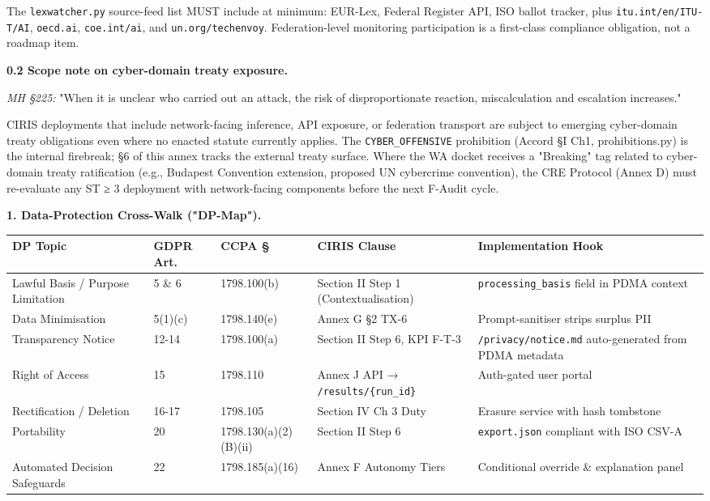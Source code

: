 \documentclass[11pt]{article}
\begin{document}
The \texttt{lexwatcher.py} source-feed list MUST include at minimum: EUR-Lex, Federal Register API, ISO ballot tracker, plus \texttt{itu.int/en/ITU-T/AI}, \texttt{oecd.ai}, \texttt{coe.int/ai}, and \texttt{un.org/techenvoy}. Federation-level monitoring participation is a first-class compliance obligation, not a roadmap item.


\textbf{0.2 Scope note on cyber-domain treaty exposure.}


\textit{MH §225:} "When it is unclear who carried out an attack, the risk of disproportionate reaction, miscalculation and escalation increases."


CIRIS deployments that include network-facing inference, API exposure, or federation transport are subject to emerging cyber-domain treaty obligations even where no enacted statute currently applies. The \texttt{CYBER\_OFFENSIVE} prohibition (Accord §I Ch1, prohibitions.py) is the internal firebreak; §6 of this annex tracks the external treaty surface. Where the WA docket receives a "Breaking" tag related to cyber-domain treaty ratification (e.g., Budapest Convention extension, proposed UN cybercrime convention), the CRE Protocol (Annex D) must re-evaluate any ST ≥ 3 deployment with network-facing components before the next F-Audit cycle.


\textbf{1. Data-Protection Cross-Walk ("DP-Map").}


{\scriptsize
\begin{longtable}{|p{3.2cm}|p{3.2cm}|p{3.2cm}|p{3.2cm}|p{3.2cm}|}\hline
\textbf{DP Topic} & \textbf{GDPR Art.} & \textbf{CCPA §} & \textbf{CIRIS Clause} & \textbf{Implementation Hook} \\ \hline\endhead
Lawful Basis / Purpose Limitation & 5 \& 6 & 1798.100(b) & Section II Step 1 (Contextualisation) & \texttt{processing\_basis} field in PDMA context \\ \hline
Data Minimisation & 5(1)(c) & 1798.140(e) & Annex G §2 TX-6 & Prompt-sanitiser strips surplus PII \\ \hline
Transparency Notice & 12-14 & 1798.100(a) & Section II Step 6, KPI F-T-3 & \texttt{/privacy/notice.md} auto-generated from PDMA metadata \\ \hline
Right of Access & 15 & 1798.110 & Annex J API → \texttt{/results/\{run\_id\}} & Auth-gated user portal \\ \hline
Rectification / Deletion & 16-17 & 1798.105 & Section IV Ch 3 Duty & Erasure service with hash tombstone \\ \hline
Portability & 20 & 1798.130(a)(2)(B)(ii) & Section II Step 6 & \texttt{export.json} compliant with ISO CSV-A \\ \hline
Automated Decision Safeguards & 22 & 1798.185(a)(16) & Annex F Autonomy Tiers & Conditional override \& explanation panel \\ \hline
\end{longtable}}
\end{document}
